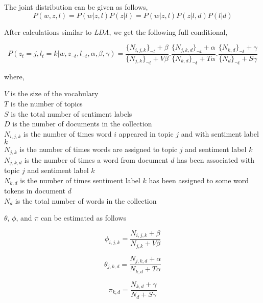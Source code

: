 The joint distribution can be given as follows,
\begin{equation}
P(w,z,l) = P(w|z,l)P(z|l) = P(w|z,l)P(z|l,d)P(l|d)
\end{equation}

After calculations similar to \textit{LDA}, we get the following full conditional,

\begin{equation}
P(z_t=j,l_t=k|w,z_{\neg t},l_{\neg t},\alpha,\beta,\gamma) = 
\frac{\{N_{i,j,k}\}_{\neg t} + \beta}{\{N_{j,k}\}_{\neg t}+V\beta}.
\frac{\{N_{j,k,d}\}_{\neg t} + \alpha}{\{N_{k,d}\}_{\neg t}+T\alpha}.
\frac{\{N_{k,d}\}_{\neg t} + \gamma}{\{N_{d}\}_{\neg t}+S\gamma}
\end{equation}

where,

\(V\) is the size of the vocabulary \\
\(T\) is the number of topics \\
\(S\) is the total number of sentiment labels \\
\(D\) is the number of documents in the collection \\
\(N_{i,j,k}\) is the number of times word \(i\) appeared in topic \(j\) and with sentiment label \(k\) \\
\(N_{j,k}\) is the number of times words are assigned to topic \(j\) and sentiment label \(k\) \\
\(N_{j,k,d}\) is the number of times a word from document \(d\) has been associated with topic \(j\) and sentiment label \(k\) \\
\(N_{k,d}\) is the number of times sentiment label \(k\) has been assigned to some word tokens in document \(d\) \\
\(N_{d}\) is the total number of words in the collection \\

\par

\(\theta\), \(\phi\), and \(\pi\) can be estimated as follows

\begin{equation}
\phi_{i,j,k} = \frac{N_{i,j,k}+\beta}{N_{j,k}+V\beta}
\end{equation}

\begin{equation}
\theta_{j,k,d} = \frac{N_{j,k,d}+\alpha}{N_{k,d}+T\alpha}
\end{equation}

\begin{equation}
\pi_{k,d} = \frac{N_{k,d}+\gamma}{N_{d}+S\gamma}
\end{equation}

